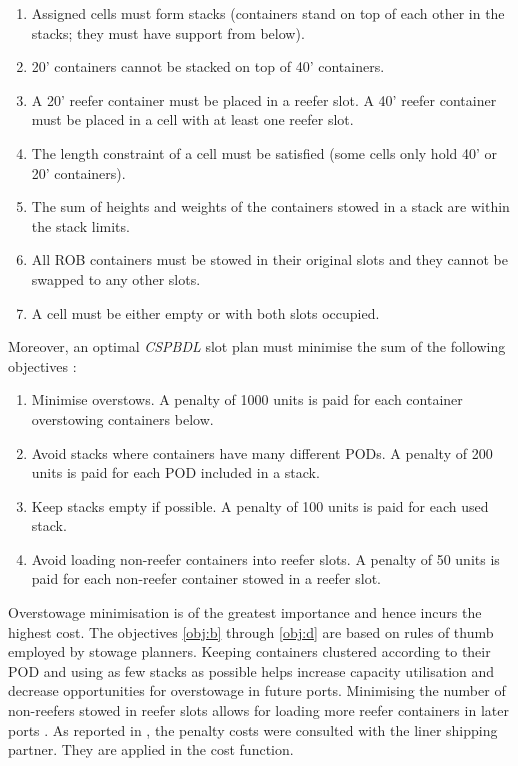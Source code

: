 \documentclass[preprint,11pt,3p]{elsarticle}
\begin{document}
\begin{enumerate}[label=(\roman*), noitemsep]
    \item \label{constr:a} Assigned cells must form stacks (containers stand on top of each other in the stacks; they must have support from below).
    \item \label{constr:b} 20' containers cannot be stacked on top of 40' containers.
    \item \label{constr:c} A 20' reefer container must be placed in a reefer slot. A 40' reefer container must be placed in a cell with at least one reefer slot.
    \item \label{constr:d} The length constraint of a cell must be satisfied (some cells only hold 40' or 20' containers).
    \item \label{constr:e} The sum of heights and weights of the containers stowed in a stack are within the stack limits.
    \item \label{constr:f} All ROB containers must be stowed in their original slots and they cannot be swapped to any other slots.
    \item \label{constr:g} A cell must be either empty or with both slots occupied.
\end{enumerate}

Moreover, an optimal \textit{CSPBDL} slot plan must minimise the sum of the following objectives \cite{DJJRA12}:

\begin{enumerate}[label=(\alph*), noitemsep]
    \item \label{obj:a} Minimise overstows. A penalty of 1000 units is paid for each container overstowing containers below.
    \item \label{obj:b} Avoid stacks where containers have many different PODs. A penalty of 200 units is paid for each POD included in a stack.
    \item \label{obj:c} Keep stacks empty if possible. A penalty of 100 units is paid for each used stack.
    \item \label{obj:d} Avoid loading non-reefer containers into reefer slots. A penalty of 50 units is paid for each non-reefer container stowed in a reefer slot.
\end{enumerate}

Overstowage minimisation is of the greatest importance and hence incurs the highest cost. The objectives \ref{obj:b} through \ref{obj:d} are based on rules of thumb employed by stowage planners. Keeping containers clustered according to their POD and using as few stacks as possible helps increase capacity utilisation and decrease opportunities for overstowage in future ports. Minimising the number of non-reefers stowed in reefer slots allows for loading more reefer containers in later ports \cite{DJJRA12}. As reported in \cite{DJJRA12}, the penalty costs were consulted with the liner shipping partner. They are applied in the cost function.
\end{document}
